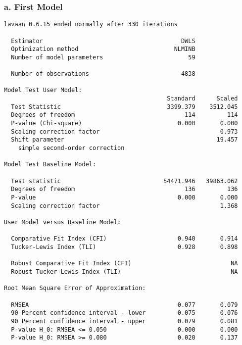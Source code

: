 \documentclass[
]{article}
\begin{document}
\hypertarget{a.-first-model}{%
\subsubsection{a. First Model}\label{a.-first-model}}

\begin{verbatim}
lavaan 0.6.15 ended normally after 330 iterations

  Estimator                                       DWLS
  Optimization method                           NLMINB
  Number of model parameters                        59

  Number of observations                          4838

Model Test User Model:
                                              Standard      Scaled
  Test Statistic                              3399.379    3512.045
  Degrees of freedom                               114         114
  P-value (Chi-square)                           0.000       0.000
  Scaling correction factor                                  0.973
  Shift parameter                                           19.457
    simple second-order correction                                

Model Test Baseline Model:

  Test statistic                             54471.946   39863.062
  Degrees of freedom                               136         136
  P-value                                        0.000       0.000
  Scaling correction factor                                  1.368

User Model versus Baseline Model:

  Comparative Fit Index (CFI)                    0.940       0.914
  Tucker-Lewis Index (TLI)                       0.928       0.898
                                                                  
  Robust Comparative Fit Index (CFI)                            NA
  Robust Tucker-Lewis Index (TLI)                               NA

Root Mean Square Error of Approximation:

  RMSEA                                          0.077       0.079
  90 Percent confidence interval - lower         0.075       0.076
  90 Percent confidence interval - upper         0.079       0.081
  P-value H_0: RMSEA <= 0.050                    0.000       0.000
  P-value H_0: RMSEA >= 0.080                    0.020       0.137
                                                                  

\end{verbatim}
\end{document}

